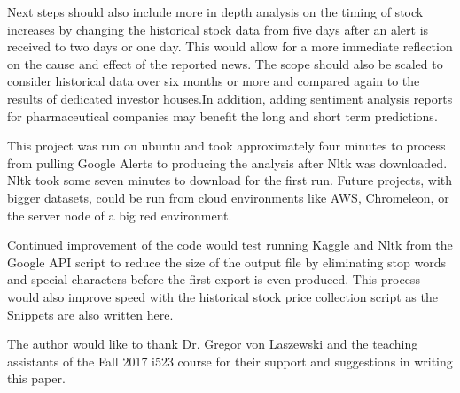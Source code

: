 \documentclass[sigconf]{acmart}
\begin{document}
Next steps should also include more in depth analysis on the timing of stock increases by changing the historical stock data from five days after an alert is received to two days or one day. This would allow for a more immediate reflection on the cause and effect of the reported news. The scope should also be scaled to consider historical data over six months or more and compared again to the results of dedicated investor houses.In addition, adding sentiment analysis reports for pharmaceutical companies may benefit the long and short term predictions.

This project was run on ubuntu and took approximately four minutes to process from pulling Google Alerts to producing the analysis after Nltk was downloaded. Nltk took some seven minutes to download for the first run. Future projects, with bigger datasets, could be run from cloud environments like AWS, Chromeleon, or the server node of a big red environment. 

Continued improvement of the code would test running Kaggle and Nltk from the Google API script to reduce the size of the output file by eliminating stop words and special characters before the first export is even produced. This process would also improve speed with the historical stock price collection script as the Snippets are also written here.


\begin{acks}

The author would like to thank Dr. Gregor von Laszewski and the teaching assistants of the Fall 2017 i523 course for their support and suggestions in writing this paper. 

\end{acks}


 
\end{document}
